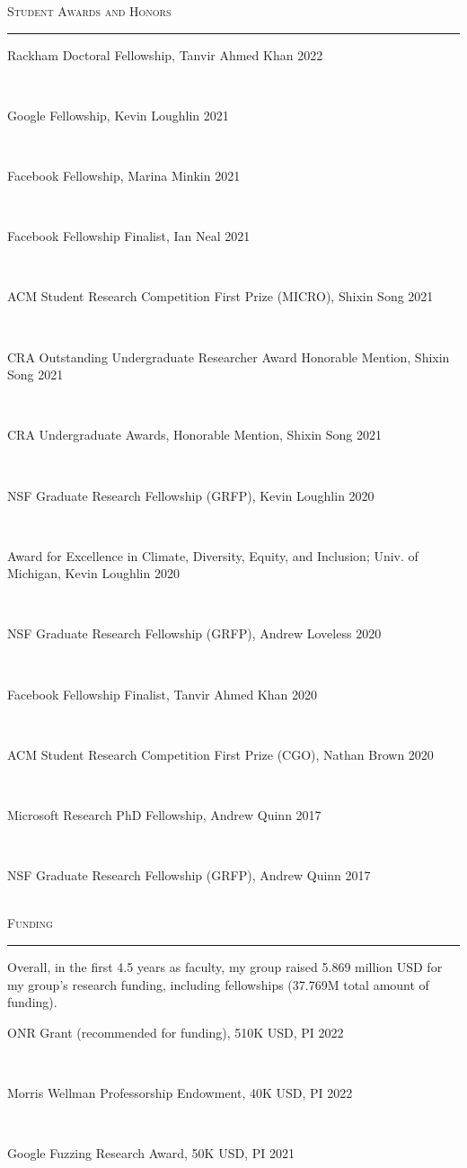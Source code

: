 \documentclass[10pt]{article}
\newcommand{\mysec}[1]{\vspace{2em}\textsc{\large #1}\vspace{1mm}\hrule\vspace{2mm}}
\newcommand{\myssub}[1]{\hspace*{2mm}\parbox{163mm}{#1}\vspace*{2mm}}
\begin{document}
\mysec{Student Awards and Honors}
\myssub{Rackham Doctoral Fellowship, Tanvir Ahmed Khan \hfill 2022} \\
\myssub{Google Fellowship, Kevin Loughlin \hfill 2021} \\
\myssub{Facebook Fellowship, Marina Minkin \hfill 2021} \\
\myssub{Facebook Fellowship Finalist, Ian Neal \hfill 2021} \\
\myssub{ACM Student Research Competition First Prize (MICRO), Shixin Song \hfill 2021} \\
\myssub{CRA Outstanding Undergraduate Researcher Award Honorable Mention, Shixin Song \hfill 2021} \\
\myssub{CRA Undergraduate Awards, Honorable Mention, Shixin Song \hfill 2021} \\
\myssub{NSF Graduate Research Fellowship (GRFP), Kevin Loughlin \hfill 2020} \\
\myssub{Award for Excellence in Climate, Diversity, Equity, and Inclusion; Univ. of Michigan, Kevin Loughlin \hfill 2020} \\
\myssub{NSF Graduate Research Fellowship (GRFP), Andrew Loveless \hfill 2020} \\
\myssub{Facebook Fellowship Finalist, Tanvir Ahmed Khan \hfill 2020} \\
\myssub{ACM Student Research Competition First Prize (CGO), Nathan Brown \hfill 2020} \\
\myssub{Microsoft Research PhD Fellowship, Andrew Quinn \hfill 2017} \\
\myssub{NSF Graduate Research Fellowship (GRFP), Andrew Quinn \hfill 2017} \\





\mysec{Funding}

Overall, in the first 4.5 years as faculty, my group raised 5.869 million USD for my group’s research funding, including fellowships (37.769M total amount of funding).\\

\myssub{ONR Grant (recommended for funding), 510K USD, PI \hfill 2022} \\
\myssub{Morris Wellman Professorship Endowment, 40K USD, PI \hfill 2022} \\
\myssub{Google Fuzzing Research Award, 50K USD, PI \hfill 2021} \\
\end{document}
